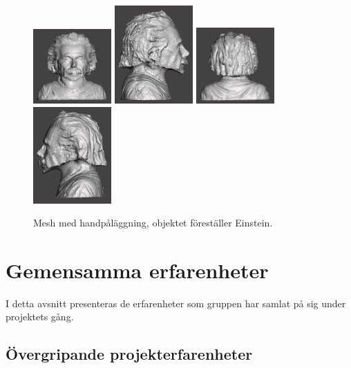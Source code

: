 \begin{figure}[H]
	\centering
	\includegraphics[width=30mm]{figures/ein_mesh_with_imposition1.png}
	\includegraphics[width=30mm]{figures/ein_mesh_with_imposition2.png}
	\includegraphics[width=30mm]{figures/ein_mesh_with_imposition3.png}
	\includegraphics[width=30mm]{figures/ein_mesh_with_imposition4.png}
	\caption{Mesh med handpåläggning, objektet föreställer Einstein.}
	\label{fig:einstein_mesh_with_imposition}
\end{figure}


\section{Gemensamma erfarenheter}
\label{cha:results_experiences}

I detta avsnitt presenteras de erfarenheter som gruppen har samlat på sig under projektets gång.

\subsection{Övergripande projekterfarenheter}

